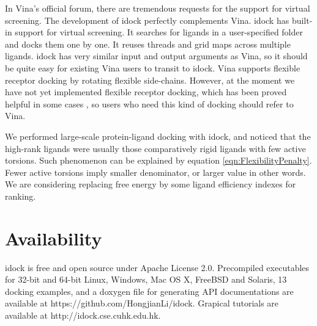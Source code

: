 In Vina's official forum, there are tremendous requests for the support for virtual screening. The development of idock perfectly complements Vina. idock has built-in support for virtual screening. It searches for ligands in a user-specified folder and docks them one by one. It reuses threads and grid maps across multiple ligands. idock has very similar input and output arguments as Vina, so it should be quite easy for existing Vina users to transit to idock. Vina supports flexible receptor docking by rotating flexible side-chains. However, at the moment we have not yet implemented flexible receptor docking, which has been proved helpful in some cases \citep{1084}, so users who need this kind of docking should refer to Vina.

We performed large-scale protein-ligand docking with idock, and noticed that the high-rank ligands were usually those comparatively rigid ligands with few active torsions. Such phenomenon can be explained by equation \eqref{eqn:FlexibilityPenalty}. Fewer active torsions imply smaller denominator, or larger value in other words. We are considering replacing free energy by some ligand efficiency indexes \citep{335,336,337} for ranking.

\section{Availability}

idock is free and open source under Apache License 2.0. Precompiled executables for 32-bit and 64-bit Linux, Windows, Mac OS X, FreeBSD and Solaris, 13 docking examples, and a doxygen file for generating API documentations are available at https://github.com/HongjianLi/idock. Grapical tutorials are available at http://idock.cse.cuhk.edu.hk.

\chapterend
